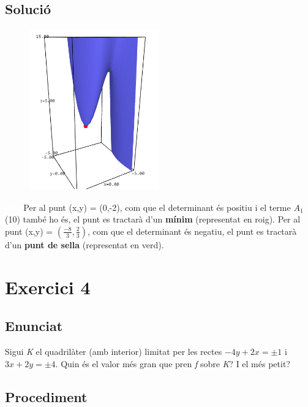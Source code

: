 \documentclass[12pt]{report}
\begin{document}
\section{Solució}
\begin{figure}
    \includegraphics[width=0.5\textwidth]{image.PNG}
    \label{$Roig: (0,-2). Verd:(-8/3, 2/3)$}
\end{figure}
\textcolor{white}{hola}
\newline
\newline
\newline
\newline
Per al punt (x,y) = (0,-2), com que el determinant és positiu i el terme $A_1$(10) també ho és, el punt es tractarà d'un \textbf{mínim} (representat en roig). \newline\newline
Per al punt (x,y) = $\left(\frac{-8}{3},\frac{2}{3}\right)$, com que el determinant és negatiu, el punt es tractarà d'un \textbf{punt de sella} (representat en verd). 


\chapter{Exercici 4}
\section{Enunciat}
Sigui \textit{K} el quadrilàter (amb interior) limitat per les rectes $-4y +2x = \pm 1$ i $3x + 2y = \pm 4$.
Quin és el valor més gran que pren \textit{f} sobre \textit{K}? I el més petit?

\section{Procediment}
\end{document}
